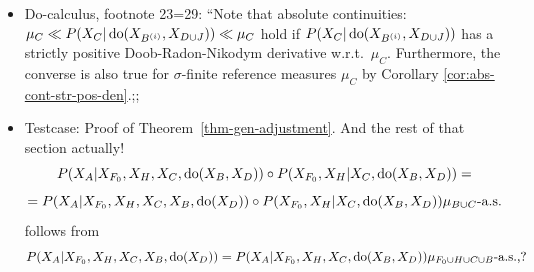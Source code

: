 \begin{Con}
\begin{itemize}
  \item Do-calculus, footnote 23=29: ``Note that absolute continuities: $\mu_C \ll P(X_C|\operatorname{do}(X_{B^{(i)}},X_{D\cup J})) \ll \mu_C$ hold if $P(X_C|\operatorname{do}(X_{B^{(i)}},X_{D\cup J}))$ has a strictly positive Doob-Radon-Nikodym derivative w.r.t.\ $\mu_C$. Furthermore, the converse is also true for $\sigma$-finite reference measures $\mu_C$ by Corollary \ref{cor:abs-cont-str-pos-den}.;;
  \item Testcase: Proof of Theorem~\ref{thm-gen-adjustment}. And the rest of that section actually!
    $$P(X_A|X_{F_0},X_H,X_C,\operatorname{do}(X_B,X_D)) \circ P(X_{F_0},X_H|X_C,\operatorname{do}(X_B,X_D)) =$$
    $$= P(X_A|X_{F_0},X_H,X_C,X_B,\operatorname{do}(X_D))\circ P(X_{F_0},X_H|X_C,\operatorname{do}(X_B,X_D)) \mu_{B \cup C}\text{-a.s.}$$
 follows from
   $$P(X_A|X_{F_0},X_H,X_C,X_B,\operatorname{do}(X_D)) = P(X_A|X_{F_0},X_H,X_C,\operatorname{do}(X_B,X_D)) \mu_{F_0 \cup H \cup C \cup B} \text{-a.s.,}?$$
 \end{itemize}
\end{Con}

